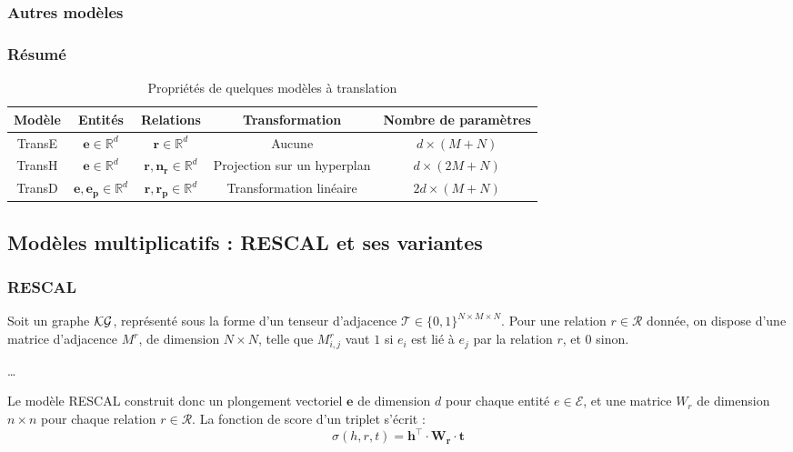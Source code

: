 \subsubsection{Autres modèles}

\subsubsection{Résumé}


\begin{table}[ht]
\caption{Propriétés de quelques modèles à translation}
\centering
\begin{tabular}{|c|c|c|c|c|}
\hline\rowcolor[gray]{0.8}\color{black}
Modèle & Entités & Relations & Transformation & Nombre de paramètres\\\hline
TransE & $\mathbf{e} \in \mathbb{R}^d$ & $\mathbf{r} \in \mathbb{R}^d$ & Aucune & $d \times (M + N)$ \\
TransH & $\mathbf{e} \in \mathbb{R}^d$ & $\mathbf{r, n_r} \in \mathbb{R}^d$ & Projection sur un hyperplan & $d \times (2M + N)$ \\
TransD & $\mathbf{e, e_p} \in \mathbb{R}^d$ & $\mathbf{r, r_p} \in \mathbb{R}^d$  & Transformation linéaire & $2d \times (M + N)$ \\\hline
\end{tabular}
\label{tab:transx}
\end{table}

\subsection{Modèles multiplicatifs : RESCAL et ses variantes}
\label{subsec:kge-models-mult}

\subsubsection{RESCAL}
Soit un graphe $\mathcal{KG}$, représenté sous la forme d'un tenseur d'adjacence $\mathcal{T} \in \{0, 1\}^{N \times M \times N}$. Pour une relation $r \in \mathcal{R}$ donnée, on dispose d'une matrice d'adjacence $M^r$, de dimension $N \times N$, telle que $M_{i, j}^r$ vaut $1$ si $e_i$ est lié à $e_j$ par la relation $r$, et $0$ sinon.

\ldots

Le modèle RESCAL \cite{nickel2011learning} construit donc un plongement vectoriel $\mathbf{e}$ de dimension $d$ pour chaque entité $e \in \mathcal{E}$, et une matrice $W_r$ de dimension $n \times n$ pour chaque relation $r \in \mathcal{R}$. La fonction de score d'un triplet s'écrit :
\begin{equation}
    \sigma(h, r, t) = \mathbf{h^\top \cdot W_r \cdot t}
    \label{eq:rescal}
\end{equation}

